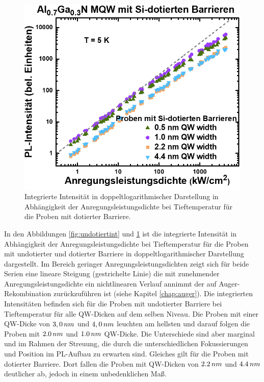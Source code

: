 \begin{figure}[H]
\begin{minipage}[t]{0.49\textwidth}
    \includegraphics[width=\linewidth]{Bilder/MQWdickenSerie/intTTdotierte.png}
		\caption{Integrierte Intensität in doppeltlogarithmischer Darstellung in Abhängigkeit der Anregungsleistungsdichte bei Tieftemperatur für die Proben mit dotierter Barriere.}
    \label{fig:dotiertint}
  \end{minipage}
\end{figure}
\noindent 
% 
In den Abbildungen \ref{fig:undotiertint} und \ref{fig:dotiertint} ist die integrierte Intensität in Abhängigkeit der Anregungsleistungsdichte bei Tieftemperatur für die Proben mit undotierter und dotierter Barriere in doppeltlogarithmischer Darstellung dargestellt.
Im Bereich geringer Anregungsleistungsdichten zeigt sich für beide Serien eine lineare Steigung (gestrichelte Linie) die mit zunehmender Anregungsleistungsdichte ein nichtlinearen Verlauf annimmt der auf Auger-Rekombination zurückzuführen ist (siehe Kapitel \ref{chap:auger}).
Die integrierten Intensitäten befinden sich für die Proben mit undotierter Barriere bei Tieftemperatur für alle QW-Dicken auf dem selben Niveau.
Die Proben mit einer QW-Dicke von $3,0 \thinspace nm$ und $4,0 \thinspace nm$ leuchten am hellsten und darauf folgen die Proben mit $2.0 \thinspace nm$ und $1.0 \thinspace nm$  QW-Dicke. Die Unterschiede sind aber marginal und im Rahmen der Streuung, die durch die unterschiedlichen Fokussierungen und Position im PL-Aufbau zu erwarten sind. Gleiches gilt für die Proben mit dotierter Barriere. Dort fallen die Proben mit QW-Dicken von $2.2 \thinspace nm$ und $4.4 \thinspace nm$ deutlicher ab, jedoch in einem unbedenklichen Maß.   
